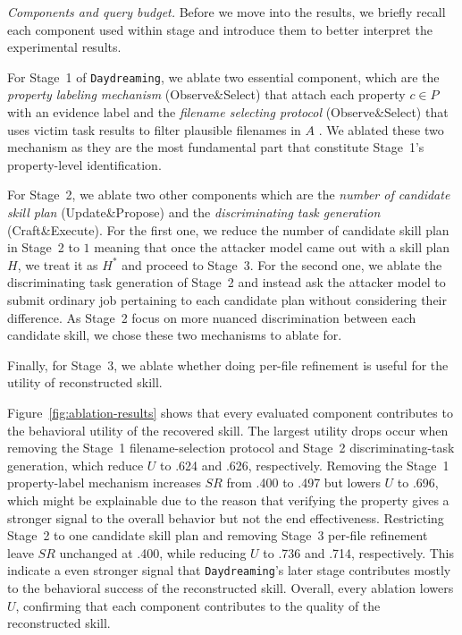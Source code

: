 \documentclass[letterpaper,twocolumn,10pt]{article}
\newcommand{\method}{\texttt{Daydreaming}\xspace}
\begin{document}
\noindent\emph{Components and query budget.} Before we move into the results, we briefly recall each component used within stage and introduce them to better interpret the experimental results. 

For Stage~1 of \method, we ablate two essential component, which are the \textit{property labeling mechanism} (Observe\&Select) that attach each property $c \in P$ with an evidence label and the \textit{filename selecting protocol} (Observe\&Select) that uses victim task results to filter plausible filenames in $A$ . We ablated these two mechanism as they are the most fundamental part that constitute Stage~1's property-level identification.  

For Stage~2, we ablate two other components which are the \textit{number of candidate skill plan} (Update\&Propose) and the \textit{discriminating task generation} (Craft\&Execute). For the first one, we reduce the number of candidate skill plan in Stage~2 to $1$ meaning that once the attacker model came out with a skill plan $H$, we treat it as $H^*$ and proceed to Stage~3. For the second one, we ablate the discriminating task generation of Stage~2 and instead ask the attacker model to submit ordinary job pertaining to each candidate plan without considering their difference. As Stage~2 focus on more nuanced discrimination between each candidate skill, we chose these two mechanisms to ablate for.

Finally, for Stage~3, we ablate whether doing per-file refinement is useful for the utility of reconstructed skill.

Figure~\ref{fig:ablation-results} shows that every evaluated component contributes to the behavioral utility of the recovered skill. The largest utility drops occur when removing the Stage~1 filename-selection protocol and Stage~2 discriminating-task generation, which reduce $U$ to .624 and .626, respectively. Removing the Stage~1 property-label mechanism increases $SR$ from .400 to .497 but lowers $U$ to .696, which might be explainable due to the reason that verifying the property gives a stronger signal to the overall behavior but not the end effectiveness. Restricting Stage~2 to one candidate skill plan and removing Stage~3 per-file refinement leave $SR$ unchanged at .400, while reducing $U$ to .736 and .714, respectively. This indicate a even stronger signal that \method's later stage contributes mostly to the behavioral success of the reconstructed skill. Overall, every ablation lowers $U$, confirming that each component contributes to the quality of the reconstructed skill.
\end{document}

